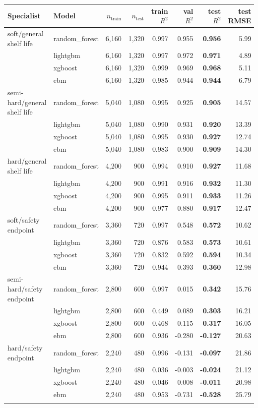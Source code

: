 \begin{tabular}{llrrrrrr}
\toprule
Specialist & Model & $n_{\text{train}}$ & $n_{\text{test}}$ & train $R^2$ & val $R^2$ & test $R^2$ & test RMSE \\
\midrule
soft/general shelf life & random\_forest & 6,160 & 1,320 & 0.997 & 0.955 & \textbf{0.956} & 5.99 \\
 & lightgbm & 6,160 & 1,320 & 0.997 & 0.972 & \textbf{0.971} & 4.89 \\
 & xgboost & 6,160 & 1,320 & 0.999 & 0.969 & \textbf{0.968} & 5.11 \\
 & ebm & 6,160 & 1,320 & 0.985 & 0.944 & \textbf{0.944} & 6.79 \\
\addlinespace[2pt]
semi-hard/general shelf life & random\_forest & 5,040 & 1,080 & 0.995 & 0.925 & \textbf{0.905} & 14.57 \\
 & lightgbm & 5,040 & 1,080 & 0.990 & 0.931 & \textbf{0.920} & 13.39 \\
 & xgboost & 5,040 & 1,080 & 0.995 & 0.930 & \textbf{0.927} & 12.74 \\
 & ebm & 5,040 & 1,080 & 0.983 & 0.900 & \textbf{0.909} & 14.30 \\
\addlinespace[2pt]
hard/general shelf life & random\_forest & 4,200 & 900 & 0.994 & 0.910 & \textbf{0.927} & 11.68 \\
 & lightgbm & 4,200 & 900 & 0.991 & 0.916 & \textbf{0.932} & 11.30 \\
 & xgboost & 4,200 & 900 & 0.995 & 0.911 & \textbf{0.933} & 11.26 \\
 & ebm & 4,200 & 900 & 0.977 & 0.880 & \textbf{0.917} & 12.47 \\
\addlinespace[2pt]
soft/safety endpoint & random\_forest & 3,360 & 720 & 0.997 & 0.548 & \textbf{0.572} & 10.62 \\
 & lightgbm & 3,360 & 720 & 0.876 & 0.583 & \textbf{0.573} & 10.61 \\
 & xgboost & 3,360 & 720 & 0.832 & 0.592 & \textbf{0.594} & 10.34 \\
 & ebm & 3,360 & 720 & 0.944 & 0.393 & \textbf{0.360} & 12.98 \\
\addlinespace[2pt]
semi-hard/safety endpoint & random\_forest & 2,800 & 600 & 0.997 & 0.015 & \textbf{0.342} & 15.76 \\
 & lightgbm & 2,800 & 600 & 0.449 & 0.089 & \textbf{0.303} & 16.21 \\
 & xgboost & 2,800 & 600 & 0.468 & 0.115 & \textbf{0.317} & 16.05 \\
 & ebm & 2,800 & 600 & 0.936 & -0.280 & \textbf{-0.127} & 20.63 \\
\addlinespace[2pt]
hard/safety endpoint & random\_forest & 2,240 & 480 & 0.996 & -0.131 & \textbf{-0.097} & 21.86 \\
 & lightgbm & 2,240 & 480 & 0.036 & -0.003 & \textbf{-0.024} & 21.12 \\
 & xgboost & 2,240 & 480 & 0.046 & 0.008 & \textbf{-0.011} & 20.98 \\
 & ebm & 2,240 & 480 & 0.953 & -0.731 & \textbf{-0.528} & 25.79 \\
\addlinespace[2pt]
\bottomrule
\end{tabular}